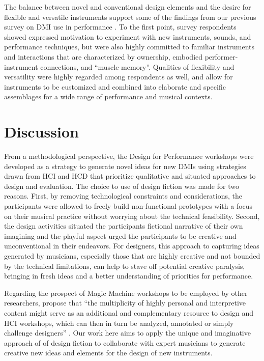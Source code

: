 \documentclass[letterpaper, 12pt]{article}
\begin{document}
The balance between novel and conventional design elements and the desire for flexible and versatile instruments support some of the findings from our previous survey on DMI use in performance
\citep{Sullivan2021jnmr}. 
To the first point, survey respondents showed expressed motivation to experiment with new instruments, sounds, and performance techniques, but were also highly committed to familiar instruments and interactions that are characterized by ownership, embodied performer-instrument connections, and ``muscle memory''. Qualities of flexibility and versatility were highly regarded among respondents as well, and allow for instruments to be customized and combined into elaborate and specific assemblages for a wide range of performance and musical contexts. 

\section{Discussion}
\label{sec:discussion}

From a methodological perspective, the Design for Performance workshops were developed as a strategy to generate novel ideas for new DMIs using strategies drawn from HCI and HCD that prioritize qualitative and situated approaches to design and evaluation. The choice to use of design fiction was made for two reasons. First, by removing technological constraints and considerations, the participants were allowed to freely build non-functional prototypes with a focus on their musical practice without worrying about the technical feasibility. Second, the design activities situated the participants fictional narrative of their own imagining and the playful aspect urged the participants to be creative and unconventional in their endeavors. For designers, this approach to capturing ideas generated by musicians, especially those that are highly creative and not bounded by the technical limitations, can help to stave off potential creative paralysis, bringing in fresh ideas and a better understanding of priorities for performance.

Regarding the prospect of Magic Machine workshops to be employed by other researchers, \citeauthor{Andersen2019} propose that ``the multiplicity of highly personal and interpretive content might serve as an additional and complementary resource to design and HCI workshops, which can then in turn be analyzed, annotated or simply challenge designers'' \citeyearpar[p. 12]{Andersen2019}. Our work here aims to apply the unique and imaginative approach of of design fiction to collaborate with expert musicians to generate creative new ideas and elements for the design of new instruments. 
\end{document}
